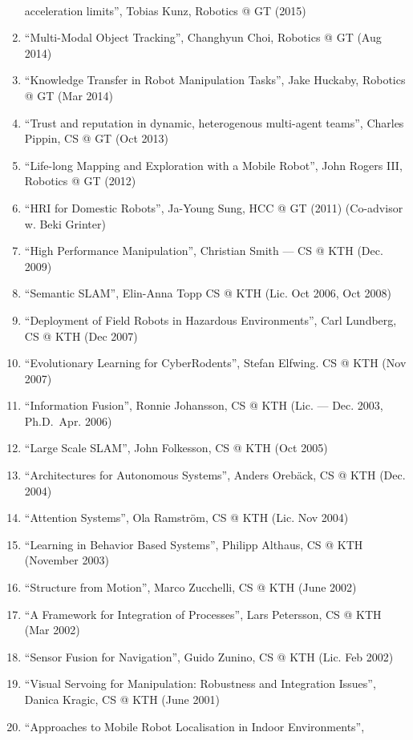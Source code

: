 \documentclass{article}
\begin{document}
\begin{cv}
\begin{cvlist}{~}
\begin{enumerate}
			      acceleration limits'', Tobias Kunz, Robotics @ GT (2015)
			\item ``Multi-Modal Object Tracking'', Changhyun Choi, Robotics @ GT (Aug
			      2014)
			\item ``Knowledge Transfer in Robot Manipulation Tasks'', Jake Huckaby,
			      Robotics @ GT (Mar 2014)
			\item ``Trust and reputation in dynamic, heterogenous multi-agent teams'',
			      Charles Pippin, CS @ GT (Oct 2013)
			\item ``Life-long Mapping and Exploration with a Mobile Robot'', John Rogers
			      III, Robotics @ GT (2012)
			\item ``HRI for Domestic Robots'', Ja-Young Sung, HCC @ GT (2011)
			      (Co-advisor w. Beki Grinter)
			\item ``High Performance Manipulation'', Christian Smith --- CS @ KTH (Dec.
			      2009)
			\item ``Semantic SLAM'', Elin-Anna Topp CS @ KTH (Lic. Oct 2006, Oct 2008)
			\item ``Deployment of Field Robots in Hazardous Environments'', Carl
			      Lundberg, CS @ KTH (Dec 2007)
			\item ``Evolutionary Learning for CyberRodents'', Stefan Elfwing. CS @ KTH
			      (Nov 2007)
			\item ``Information Fusion'', Ronnie Johansson, CS @ KTH (Lic. --- Dec. 2003,
			      Ph.D.\ Apr. 2006)
			\item ``Large Scale SLAM'', John Folkesson, CS @ KTH (Oct 2005)
			\item ``Architectures for Autonomous Systems'', Anders Oreb{\"a}ck, CS @ KTH
			      (Dec. 2004)
			\item ``Attention Systems'', Ola Ramstr\"om, CS @ KTH (Lic. Nov 2004)
			\item ``Learning in Behavior Based Systems'', Philipp Althaus, CS @ KTH
			      (November 2003)
			\item ``Structure from Motion'', Marco Zucchelli, CS @ KTH (June 2002)
			\item ``A Framework for Integration of Processes'', Lars Petersson, CS @ KTH
			      (Mar 2002)
			\item ``Sensor Fusion for Navigation'', Guido Zunino, CS @ KTH (Lic. Feb
			      2002)
			\item ``Visual Servoing for Manipulation: Robustness and Integration
			      Issues'', Danica Kragic, CS @ KTH (June 2001)
			\item ``Approaches to Mobile Robot Localisation in Indoor Environments'',

\end{enumerate}
\end{cvlist}
\end{cv}
\end{document}
